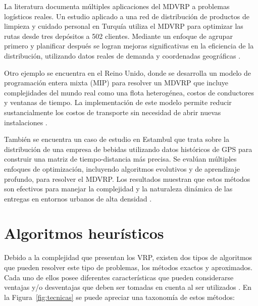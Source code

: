 
La literatura documenta múltiples aplicaciones del MDVRP a problemas logísticos reales. Un estudio aplicado a una red de distribución de productos de limpieza y cuidado personal en Turquía utiliza el MDVRP para optimizar las rutas desde tres depósitos a 502 clientes. Mediante un enfoque de agrupar primero y planificar después se logran mejoras significativas en la eficiencia de la distribución, utilizando datos reales de demanda y coordenadas geográficas \parencite{hamidOptimizationEssentialsTheory2024}.

Otro ejemplo se encuentra en el Reino Unido, donde se desarrolla un modelo de programación entera mixta (MIP) \parencite{junger50YearsInteger2009} para resolver un MDVRP que incluye complejidades del mundo real como una flota heterogénea, costos de conductores y ventanas de tiempo. La implementación de este modelo permite reducir sustancialmente los costos de transporte sin necesidad de abrir nuevas instalaciones \parencite{mogaleModellingOptimisingMultidepot2025}.

También se encuentra un caso de estudio en Estambul que trata sobre la distribución de una empresa de bebidas utilizando datos históricos de GPS para construir una matriz de tiempo-distancia más precisa. Se evalúan múltiples enfoques de optimización, incluyendo algoritmos evolutivos y de aprendizaje profundo, para resolver el MDVRP. Los resultados muestran que estos métodos son efectivos para manejar la complejidad y la naturaleza dinámica de las entregas en entornos urbanos de alta densidad  \parencite{erdemAIInfusedEvolutionaryOptimization2025}.

\section{Algoritmos heurísticos}

Debido a la complejidad que presentan los VRP, existen dos tipos de algoritmos que pueden resolver este tipo de problemas, los métodos exactos y aproximados. Cada uno de ellos posee diferentes características que pueden considerarse ventajas y/o desventajas que deben ser tomadas en cuenta al ser utilizados \parencite{colinDisenoAlgoritmoMetaheuristico2024}. En la Figura~\ref{fig:tecnicas} se puede apreciar una taxonomía de estos métodos:


